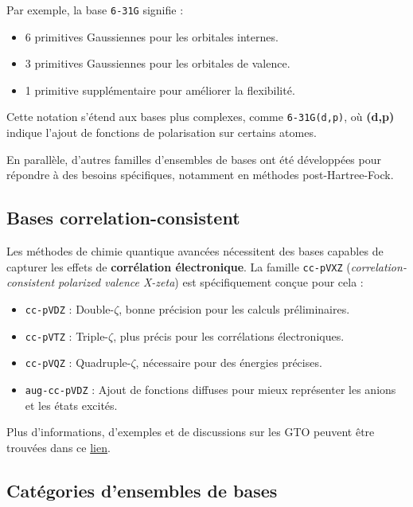 \documentclass[12pt,a4paper]{article} %
\numberwithin{equation}{section} %
\numberwithin{figure}{section} %
\numberwithin{table}{section} %
\begin{document}
Par exemple, la base \texttt{6-31G} signifie :
\begin{itemize}
    \item 6 primitives Gaussiennes pour les orbitales internes.
    \item 3 primitives Gaussiennes pour les orbitales de valence.
    \item 1 primitive supplémentaire pour améliorer la flexibilité.
\end{itemize}
Cette notation s’étend aux bases plus complexes, comme \texttt{6-31G(d,p)}, où \textbf{(d,p)} indique l’ajout de fonctions de polarisation sur certains atomes.

En parallèle, d'autres familles d’ensembles de bases ont été développées pour répondre à des besoins spécifiques, notamment en méthodes post-Hartree-Fock.

\subsection{Bases correlation-consistent}

Les méthodes de chimie quantique avancées nécessitent des bases capables de capturer les effets de \textbf{corrélation électronique}. La famille \texttt{cc-pVXZ} (\textit{correlation-consistent polarized valence X-zeta}) est spécifiquement conçue pour cela :
\begin{itemize}
    \item \texttt{cc-pVDZ} : Double-$\zeta$, bonne précision pour les calculs préliminaires.
    \item \texttt{cc-pVTZ} : Triple-$\zeta$, plus précis pour les corrélations électroniques.
    \item \texttt{cc-pVQZ} : Quadruple-$\zeta$, nécessaire pour des énergies précises.
    \item \texttt{aug-cc-pVDZ} : Ajout de fonctions diffuses pour mieux représenter les anions et les états excités.
\end{itemize}

Plus d'informations, d'exemples et de discussions sur les GTO peuvent être trouvées dans ce  
\href{https://chem.libretexts.org/Courses/Pacific_Union_College/Quantum_Chemistry/11\%3A_Computational_Quantum_Chemistry/11.02\%3A_Gaussian_Basis_Sets}{lien}.

\subsection{Catégories d'ensembles de bases}
\end{document}
